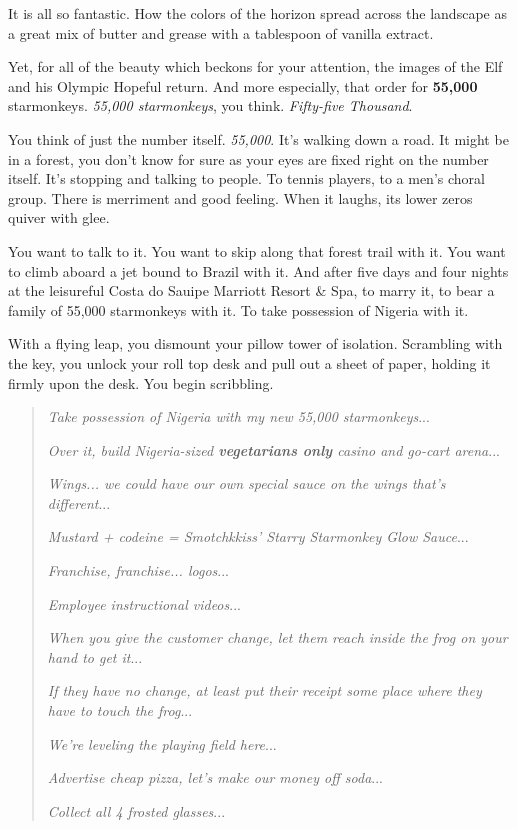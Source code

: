 \documentclass[12pt,twoside]{report}
\begin{document}
It is all so fantastic.  How the colors of the horizon spread across
the landscape as a great mix of butter and grease with a tablespoon of
vanilla extract.

Yet, for all of the beauty which beckons for your attention, the
images of the Elf and his Olympic Hopeful return.  And more
especially, that order for {\bf 55,000} starmonkeys.  {\em 55,000
  starmonkeys}, you think.  {\em Fifty-five Thousand}.

You think of just the number itself.  {\em 55,000}.  It's walking down
a road.  It might be in a forest, you don't know for sure as your eyes
are fixed right on the number itself.  It's stopping and talking to
people.  To tennis players, to a men's choral group.  There is
merriment and good feeling.  When it laughs, its lower zeros quiver
with glee.

You want to talk to it.  You want to skip along that forest trail with
it.  You want to climb aboard a jet bound to Brazil with it.  And
after five days and four nights at the leisureful Costa do Sauipe
Marriott Resort \& Spa, to marry it, to bear a family of 55,000
starmonkeys with it. To take possession of Nigeria with it.

With a flying leap, you dismount your pillow tower of isolation.
Scrambling with the key, you unlock your roll top desk and pull out a
sheet of paper, holding it firmly upon the desk.  You begin
scribbling.

\begin{quote}


 {\em Take possession of Nigeria with my new 55,000 starmonkeys}...

 

 {\em Over it, build Nigeria-sized {\bf vegetarians only} casino and
   go-cart arena}...

 

 {\em Wings... we could have our own special sauce on the wings that's
   different}...

 

 {\em Mustard + codeine = Smotchkkiss' Starry Starmonkey Glow
   Sauce}...

 

 {\em Franchise, franchise... logos}...

 

 {\em Employee instructional videos}...

 

 {\em When you give the customer change, let them reach inside the
   frog on your hand to get it}...

 

 {\em If they have no change, at least put their receipt some place
   where they have to touch the frog}...

 

 {\em We're leveling the playing field here}...

 

 {\em Advertise cheap pizza, let's make our money off soda}...

 

 {\em Collect all 4 frosted glasses}...

\end{quote}
\end{document}
